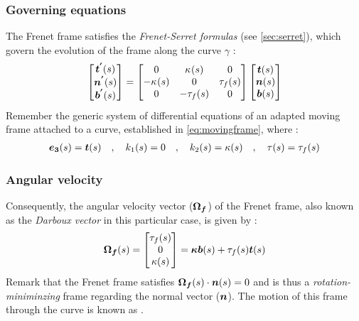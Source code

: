 \subsubsection{Governing equations}\label{sec:serretfrenet}
The Frenet frame satisfies the \emph{Frenet-Serret formulas} (see \cref{sec:serret}), which govern the evolution of the frame along the curve $\gamma$ :
\begin{equation}
	\begin{bmatrix}
		\boldsymbol{t^{'}}(s) \\
		\boldsymbol{n^{'}}(s) \\
		\boldsymbol{b^{'}}(s)
	\end{bmatrix}
	=
	\begin{bmatrix}
		0 & \kappa_{}(s) & 0 \\
		-\kappa_{}(s) & 0 & \tau_f(s) \\
		0 & -\tau_f(s) & 0
	\end{bmatrix}
	\begin{bmatrix}
		\boldsymbol{t}(s) \\
		\boldsymbol{n}(s) \\
		\boldsymbol{b}(s)
	\end{bmatrix}
\label{eq:frenetframegoverning}
\end{equation}
Remember the generic system of differential equations of an adapted moving frame attached to a curve, established in \cref{eq:movingframe}, where :
\begin{gather}
\boldsymbol{e_{3}}(s) = \boldsymbol{t}(s)
\quad,\quad
k_{1}(s) = 0
\quad,\quad
k_{2}(s) = \kappa(s)
\quad,\quad
\tau(s) = \tau_{f}(s)
\end{gather}

\subsubsection{Angular velocity}
Consequently, the angular velocity vector ($\boldsymbol{\Omega_{f}}$) of the Frenet frame, also known as the \emph{Darboux vector} in this particular case, is given by :
\begin{equation}
	\boldsymbol{\Omega_f}(s)
	=
	\begin{bmatrix}
		\tau_{f}(s) \\
		0 \\
		\kappa(s)
	\end{bmatrix}
	= \boldsymbol{\kappa b}(s) +\tau_{f}(s) \boldsymbol{t}(s)
\end{equation}
Remark that the Frenet frame satisfies $\boldsymbol{\Omega_f}(s) \cdot \boldsymbol{n}(s) = 0$ and is thus a \emph{rotation-miniminzing} frame regarding the normal vector ($\boldsymbol{n}$). The motion of this frame through the curve is known as .

